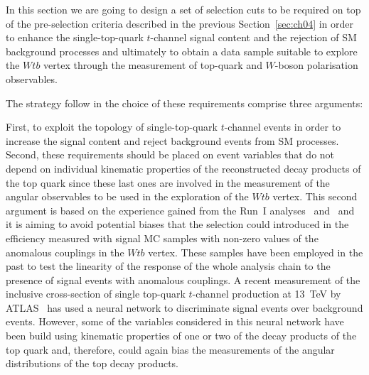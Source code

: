 

In this section we are going to design a set of selection cuts to be required on top of the pre-selection criteria described in the previous Section~\ref{sec:ch04} in order to enhance the single-top-quark $t$-channel signal content and the rejection of SM background processes and ultimately 
to obtain a data sample suitable to explore the $Wtb$ vertex through the measurement of top-quark and $W$-boson polarisation observables.


The strategy follow in the choice of these requirements comprise three arguments:

First, to exploit the topology of single-top-quark $t$-channel events in order to increase the signal content and reject background events from SM processes.
Second, these requirements should be placed on event variables that do not depend on individual kinematic properties of the reconstructed decay products of the top quark since these last ones are involved in the measurement of the angular observables to be used in the exploration of the $Wtb$ vertex. This second argument is based on the experience gained from the Run~I analyses~\cite{Probing} and~\cite{Aaboud:2017yqf} and it is aiming to avoid potential biases that the selection could introduced in the efficiency measured with signal MC samples with non-zero values of the anomalous couplings in the $Wtb$ vertex. These samples have been employed in the past to test the linearity of the response of the whole analysis chain to the presence of signal events with anomalous couplings. A recent measurement of the inclusive cross-section of single top-quark $t$-channel production at 13~TeV by ATLAS~\cite{Aaboud:2016ymp} has used a neural network to discriminate signal events over background events. However, some of the variables considered in this neural network have been build using kinematic properties of one or two of the decay products of the top quark and, therefore, could again bias the measurements of the angular distributions of the top decay products.


